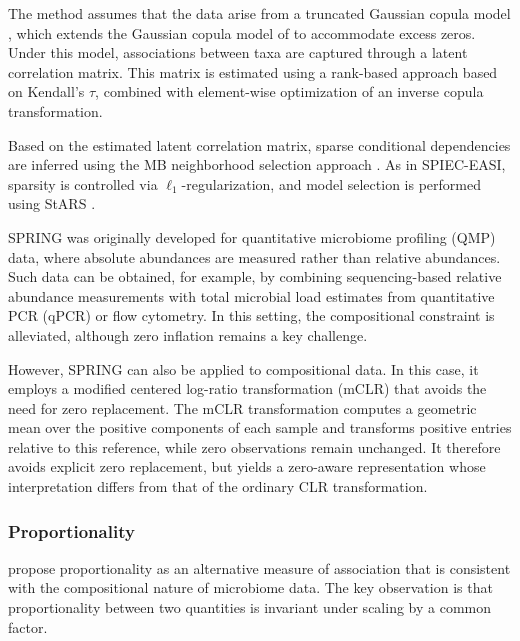 The method assumes that the data arise from a truncated Gaussian copula model \citep{yoon2020sparse}, which extends the Gaussian copula model of \citet{liu2009nonparanormal} to accommodate excess zeros. Under this model, associations between taxa are captured through a latent correlation matrix. This matrix is estimated using a rank-based approach based on Kendall's $\tau$, combined with element-wise optimization of an inverse copula transformation.

Based on the estimated latent correlation matrix, sparse conditional dependencies are inferred using the MB neighborhood selection approach \citep{meinshausen2006highdimensional}. As in SPIEC-EASI, sparsity is controlled via $\ell_1$-regularization, and model selection is performed using StARS \citep{liu2010stability}.

SPRING was originally developed for quantitative microbiome profiling (QMP) data, where absolute abundances are measured rather than relative abundances. Such data can be obtained, for example, by combining sequencing-based relative abundance measurements with total microbial load estimates from quantitative PCR (qPCR) or flow cytometry. In this setting, the compositional constraint is alleviated, although zero inflation remains a key challenge. 

However, SPRING can also be applied to compositional data. In this case, it employs a modified centered log-ratio transformation (mCLR) that avoids the need for zero replacement. The mCLR transformation computes a geometric mean over the positive components of each sample and transforms positive entries relative to this reference, while zero observations remain unchanged. It therefore avoids explicit zero replacement, but yields a zero-aware representation whose interpretation differs from that of the ordinary CLR transformation.

\subsubsection{Proportionality}
\label{sec:5net:net_constr:proportionality}

\citet{lovell2015proportionality} propose proportionality as an alternative measure of association that is consistent with the compositional nature of microbiome data. The key observation is that proportionality between two quantities is invariant under scaling by a common factor.

